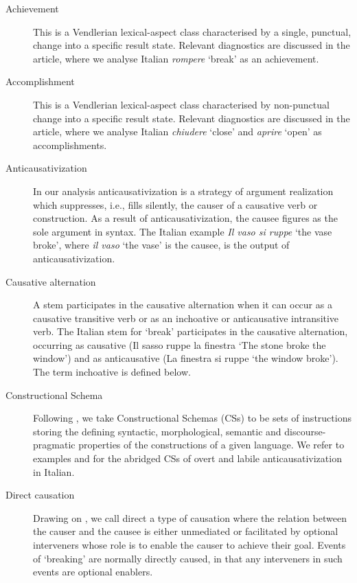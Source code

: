 \documentclass[output=paper,colorlinks,citecolor=brown
]{langscibook}
\begin{document}
%
\begin{description}
\item[Achievement] This is a Vendlerian   lexical-aspect class characterised by a single, punctual, change into a specific   result state. Relevant diagnostics are discussed in the article, where we   analyse Italian \textit{rompere} ‘break’ as an achievement.
\item[Accomplishment] This is a Vendlerian   lexical-aspect class characterised by non-punctual change into a specific result   state. Relevant diagnostics are discussed in the article, where we analyse Italian   \textit{chiudere} ‘close’ and \textit{aprire} ‘open’ as accomplishments.
\item[Anticausativization] In our analysis anticausativization   is a strategy of argument realization which suppresses, i.e., fills   silently, the causer of a causative verb or construction. As a result of anticausativization,   the causee figures as the sole argument in syntax. The Italian example \textit{Il   vaso si ruppe} ‘the vase broke’, where \textit{il vaso} ‘the vase’ is the   causee, is the output of anticausativization.
\item[Causative   alternation] A stem participates in the causative   alternation when it can occur as a causative transitive verb or as an   inchoative or anticausative intransitive verb. The Italian stem for ‘break’   participates in the causative alternation, occurring as causative (Il sasso   ruppe la finestra ‘The stone broke the window’) and as anticausative (La   finestra si ruppe ‘the window broke’). The term inchoative   is defined below.
\item[Constructional   Schema] Following \citet{vanvalin2023principles}, we   take Constructional Schemas (CSs) to be sets of instructions storing   the defining syntactic, morphological, semantic and discourse-pragmatic   properties of the constructions of a given language. We refer to examples    and  for the abridged CSs of overt and labile anticausativization in   Italian.
\item[Direct   causation] Drawing on \citet{wolff2003direct}, we call direct   a type of causation where the relation between the causer and the causee is   either unmediated or facilitated by optional interveners whose role is to   enable the causer to achieve their goal. Events of ‘breaking’ are normally   directly caused, in that any interveners in such events are optional   enablers.

\end{description}
\end{document}
